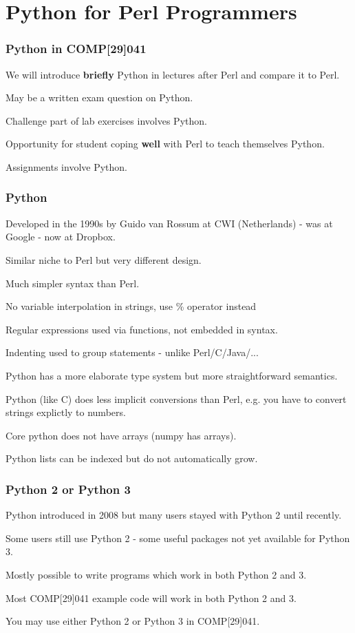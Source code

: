 

\section{Python for Perl Programmers}
\begin{frame}
\frametitle{Python in COMP[29]041}
We will introduce {\bf{briefly}} Python in lectures after Perl
and compare it to Perl.

May be a written exam question on Python.

Challenge part of lab exercises involves Python.

Opportunity for student coping {\bf{well}} with Perl to
teach themselves Python.

Assignments involve Python.
\end{frame}

\begin{frame}
\frametitle{Python}

Developed in the 1990s by Guido van Rossum at CWI (Netherlands) - was at Google - now at Dropbox.

Similar niche to Perl but very different design.

Much simpler syntax than Perl.

No variable interpolation in strings, use \% operator instead

Regular expressions used via functions, not embedded in syntax.

Indenting used to group statements - unlike Perl/C/Java/... 

Python has a more elaborate type system but more straightforward semantics.

Python (like C) does less implicit conversions than Perl, e.g. you have to
convert strings explictly to numbers.

Core python does not have arrays (numpy has arrays).

Python lists can be indexed but do not automatically grow.

\end{frame}

\begin{frame}
\frametitle{Python 2 or Python 3}

Python introduced in 2008 but many users stayed with Python 2 until recently.

Some users still use Python 2 - some useful packages not yet available for Python 3.

Mostly possible to write programs which work in both Python 2 and 3.

Most COMP[29]041 example code will work in both Python 2 and 3.

You may use either Python 2 or Python 3 in COMP[29]041.

\end{frame}

